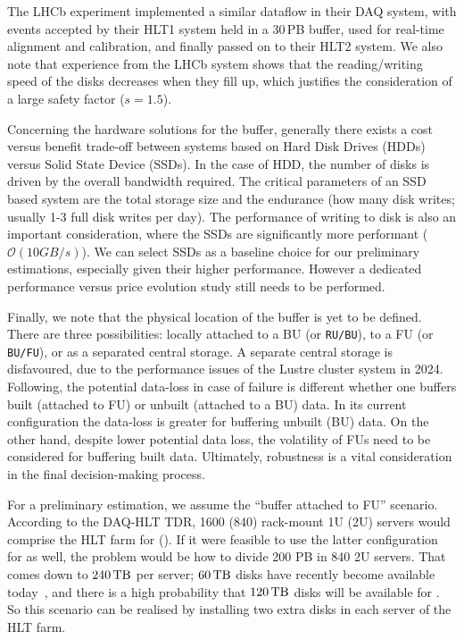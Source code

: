 The LHCb experiment implemented a similar dataflow in their DAQ system, with events accepted by their HLT1 system held in a 30\,PB buffer, used for real-time alignment and calibration, and finally passed on to their HLT2 system. We also note that experience from the LHCb system shows that the reading/writing speed of the disks decreases when they fill up, which justifies the consideration of a large safety factor ($s = 1.5$).

Concerning the hardware solutions for the buffer, generally there exists a cost versus benefit trade-off between systems based on Hard Disk Drives (HDDs) versus Solid State Device (SSDs). In the case of HDD, the number of disks is driven by the overall bandwidth required. The critical parameters of an SSD based system are the total storage size and the endurance (how many disk writes; usually 1-3 full disk writes per day). The performance of writing to disk is also an important consideration, where the SSDs are significantly more performant ($\mathcal{O}(10 GB/s)$). We can select SSDs as a baseline choice for our preliminary estimations, especially given their higher performance. However a dedicated performance versus price evolution study still needs to be performed.

Finally, we note that the physical location of the buffer is yet to be defined. There are three possibilities: 
locally attached to a BU (or \texttt{RU/BU}), to a FU (or \texttt{BU/FU}), or as a separated central storage. A separate central storage is disfavoured, due to the performance issues of the Lustre cluster system in 2024. Following, the potential data-loss in case of failure is different whether one buffers built (attached to FU) or unbuilt (attached to a BU) data. In its current configuration the data-loss is greater for buffering unbuilt (BU) data. On the other hand, despite lower potential data loss, the volatility of FUs need to be considered for buffering built data. Ultimately, robustness is a vital consideration in the final decision-making process.

For a preliminary estimation, we assume the ``buffer attached to FU'' scenario.
According to the DAQ-HLT TDR,
1600 (840) rack-mount 1U (2U) servers would comprise the HLT farm for \Runfour (\Runfive).
If it were feasible to use the latter configuration for \Runfour as well,
the problem would be how to divide 200 PB in 840 2U servers.
That comes down to  $240\,\text{TB}$ per server; $60\,\text{TB}$ disks have recently become available today~\cite{micron60tb},
and there is a high probability that $120\,\text{TB}$ disks will be available for \Runfour. So this scenario can be realised by installing two extra disks in each server of the HLT farm.

